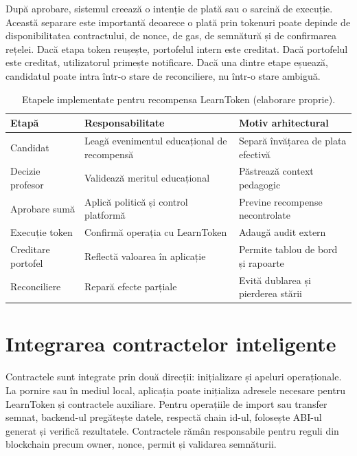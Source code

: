 După aprobare, sistemul creează o intenție de plată sau o sarcină de execuție. Această separare este importantă deoarece o plată prin tokenuri poate depinde de disponibilitatea contractului, de nonce, de gas, de semnătură și de confirmarea rețelei. Dacă etapa token reușește, portofelul intern este creditat. Dacă portofelul este creditat, utilizatorul primește notificare. Dacă una dintre etape eșuează, candidatul poate intra într-o stare de reconciliere, nu într-o stare ambiguă.

\begin{table}[H]
    \centering
    \caption{Etapele implementate pentru recompensa LearnToken (elaborare proprie).}
    \label{tab:etape_recompensa_impl}
    \begin{tabular}{P{3.3cm}P{5.2cm}P{5.2cm}}
        \toprule
        Etapă & Responsabilitate & Motiv arhitectural \\
        \midrule
        Candidat & Leagă evenimentul educațional de recompensă & Separă învățarea de plata efectivă \\
        Decizie profesor & Validează meritul educațional & Păstrează context pedagogic \\
        Aprobare sumă & Aplică politică și control platformă & Previne recompense necontrolate \\
        Execuție token & Confirmă operația cu LearnToken & Adaugă audit extern \\
        Creditare portofel & Reflectă valoarea în aplicație & Permite tablou de bord și rapoarte \\
        Reconciliere & Repară efecte parțiale & Evită dublarea și pierderea stării \\
        \bottomrule
    \end{tabular}
\end{table}

\section{Integrarea contractelor inteligente}
Contractele sunt integrate prin două direcții: inițializare și apeluri operaționale. La pornire sau în mediul local, aplicația poate inițializa adresele necesare pentru LearnToken și contractele auxiliare. Pentru operațiile de import sau transfer semnat, backend-ul pregătește datele, respectă chain id-ul, folosește ABI-ul generat și verifică rezultatele. Contractele rămân responsabile pentru reguli din blockchain precum owner, nonce, permit și validarea semnăturii.

